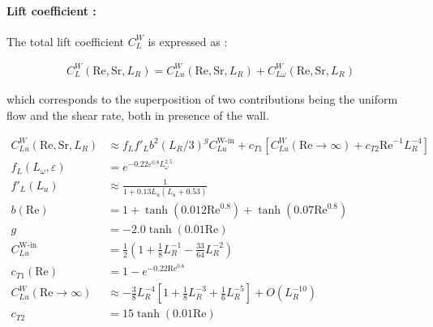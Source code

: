 \paragraph{Lift coefficient :} The total lift coefficient $C_{L}^{W}$ is expressed as :


\begin{align}
C_{L}^{W}\left(\text{Re}, \text{Sr}, L_{R}\right)=C_{Lu}^{W}\left(\text{Re}, \text{Sr}, L_{R}\right) + C_{L\omega}^{W}\left(\text{Re}, \text{Sr}, L_{R}\right)
\end{align}

which corresponds to the superposition of two contributions being the uniform flow and the shear rate, both in presence of the wall.

\npar
\begin{align}
C_{Lu}^{W}\left(\text{Re}, \text{Sr}, L_{R}\right) &\approx f_{L} f'_{L} b^{2}\left(L_{R}/3\right)^{g}C_{Lu}^{\text{W-in}}+c_{T1}\left[C_{Lu}^{W}\left(\text{Re} \rightarrow \infty\right) + c_{T2}\text{Re}^{-1}L_{R}^{-4}\right]\\
f_{L}\left(L_{\omega},\varepsilon\right) &= e^{-0.22 \varepsilon^{0.8}L_{\omega}^{2.5}} \\
f'_{L}\left(L_{u}\right)&\approx\frac{1}{1+0.13L_{u}\left(L_{u}+0.53\right)}\\
b\left(\text{Re}\right)&= 1 + \tanh\left(0.012\text{Re}^{0.8}\right)+\tanh\left(0.07\text{Re}^{0.8}\right) \\
g&= -2.0\tanh\left(0.01\text{Re}\right)\\
C_{Lu}^{\text{W-in}}&=\frac{1}{2}\left(1+\frac{1}{8}L_{R}^{-1}-\frac{33}{64}L_{R}^{-2}\right)\\
c_{T1}\left(\text{Re}\right)&=1-e^{-0.22\text{Re}^{0.6}} \\
C_{Lu}^{W}\left(\text{Re}\rightarrow \infty \right)&\approx -\frac{3}{8}L_{R}^{-4}\left[1+\frac{1}{8}L_{R}^{-3}+\frac{1}{6}L_{R}^{-5}\right] + O\left(L_{R}^{-10}\right)\\
c_{T2}&=15 \tanh\left( 0.01\text{Re} \right)
\end{align}


